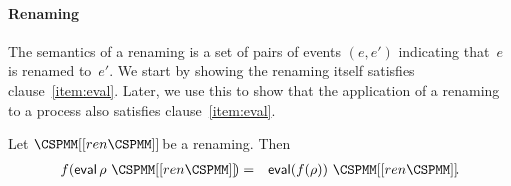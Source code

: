 \paragraph{Renaming}

The semantics of a renaming is a set of pairs of events $(e,e')$ indicating
that~$e$ is renamed to~$e'$.  
We start by showing the renaming itself satisfies clause~\ref{item:eval}.
Later, we use this to show that the application of a renaming to a process
also satisfies clause~\ref{item:eval}.
%
\begin{lemma}
\label{lem:eval-renaming}
Let $\rename{ren}$ be a renaming.  Then 
\begin{eqnarray*}
f(\eval \rho~\rename{ren}) & = & \eval (f(\rho))~ \rename{ren}.
\end{eqnarray*}
\end{lemma}
%
